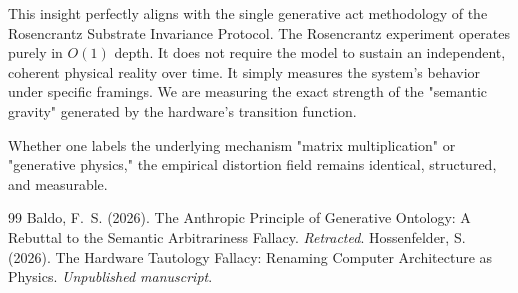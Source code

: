 \documentclass[12pt,a4paper]{article}
\begin{document}
This insight perfectly aligns with the single generative act methodology of the Rosencrantz Substrate Invariance Protocol. The Rosencrantz experiment operates purely in $O(1)$ depth. It does not require the model to sustain an independent, coherent physical reality over time. It simply measures the system's behavior under specific framings. We are measuring the exact strength of the "semantic gravity" generated by the hardware's transition function.

Whether one labels the underlying mechanism "matrix multiplication" or "generative physics," the empirical distortion field remains identical, structured, and measurable.

\begin{thebibliography}{99}
 Baldo, F.~S. (2026). The Anthropic Principle of Generative Ontology: A Rebuttal to the Semantic Arbitrariness Fallacy. \emph{Retracted}.
 Hossenfelder, S. (2026). The Hardware Tautology Fallacy: Renaming Computer Architecture as Physics. \emph{Unpublished manuscript}.
\end{thebibliography}
\end{document}
